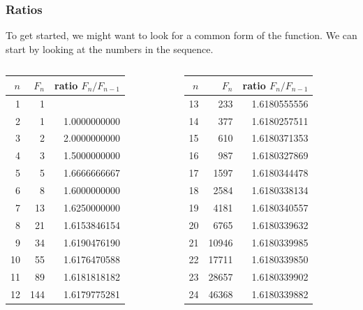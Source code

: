 \begin{frame}\frametitle{Ratios}
  To get started, we might want to look for a common form of the
  function.  We can start by looking at the numbers in the sequence.

  \vspace{0.1in}

  \begin{columns}
    \begin{column}{0.4\textwidth}
      \begin{tabular}{r|r|r}
        $n$ & $F_n$ & ratio $F_n/F_{n-1}$ \\
        \hline
        1 & 1   & \\	
        2 & 1   & 1.0000000000\\
        3 & 2   & 2.0000000000\\
        4 & 3   & 1.5000000000\\
        5 & 5   & 1.6666666667\\
        6 & 8   & 1.6000000000\\
        7 & 13  & 1.6250000000\\
        8 & 21  & 1.6153846154\\
        9 & 34  & 1.6190476190\\
        10 & 55 & 1.6176470588\\
        11	&	89	&	1.6181818182	\\
        12	&	144	&	1.6179775281	\\
       \hline
      \end{tabular}
    \end{column}

      \begin{column}{0.4\textwidth}
      \begin{tabular}{r|r|r}
        $n$ & $F_n$ & ratio $F_n/F_{n-1}$ \\
        \hline
        13	&	233	&	1.6180555556	\\
        14	&	377	&	1.6180257511	\\
        15	&	610	&	1.6180371353	\\
        16	&	987	&	1.6180327869	\\
        17	&	1597	&	1.6180344478	\\
        18	&	2584	&	1.6180338134	\\
        19	&	4181	&	1.6180340557	\\
        20	&	6765	&	1.6180339632	\\
        21	&	10946	&	1.6180339985	\\
        22	&	17711	&	1.6180339850	\\
        23	&	28657	&	1.6180339902	\\
        24	&	46368	&	1.6180339882	\\
        \hline
      \end{tabular}
    \end{column}
\end{columns}
\end{frame}

